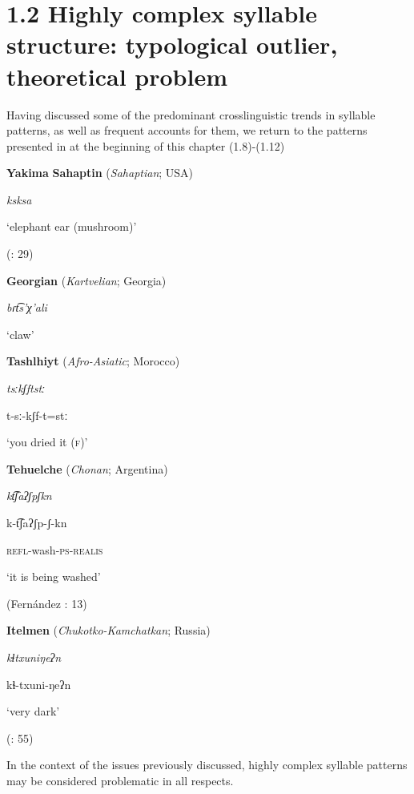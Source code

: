 \section{1.2 Highly complex syllable structure: typological outlier, theoretical problem}

  Having discussed some of the predominant crosslinguistic trends in syllable patterns, as well as frequent accounts for them, we return to the patterns presented in at the beginning of this chapter (1.8)-(1.12)

\ea\label{ex:(1.8)}
   \textbf{Yakima} \textbf{Sahaptin} (\textit{Sahaptian}; USA)

\textit{ksksa}

‘elephant ear (mushroom)’

(\citealt{HargusBeavert2006}: 29)
\z

\ea\label{ex:(1.9)}
   \textbf{Georgian} (\textit{Kartvelian}; Georgia)

\textit{bɾt͡s’χ’ali}

‘claw’

\citep[204]{Butskhrikidze2002}
\z

\ea\label{ex:(1.10)}
   \textbf{Tashlhiyt} (\textit{Afro-Asiatic}; Morocco)

\textit{tsːkʃftstː}

t-sː-kʃf-t=stː

‘you dried it (\textsc{f})’

\citep[332]{Ridouane2008}

\z

\ea\label{ex:(1.11)}
   \textbf{Tehuelche} (\textit{Chonan}; Argentina)

\textit{kt͡ʃaʔʃpʃkn}

k-t͡ʃaʔʃp-ʃ-kn

\textsc{refl}-wash-\textsc{ps-realis}

‘it is being washed’

(Fernández \citealt{GarayHernández2006}: 13)
\z

\ea\label{ex:(1.12)}
   \textbf{Itelmen} (\textit{Chukotko-Kamchatkan}; Russia)

\textit{kɬtxuniŋeʔn}

kɬ-txuni-ŋeʔn

‘very dark’

(\citealt{GeorgVolodin1999}: 55)

\z

In the context of the issues previously discussed, highly complex syllable patterns may be considered problematic in all respects.

